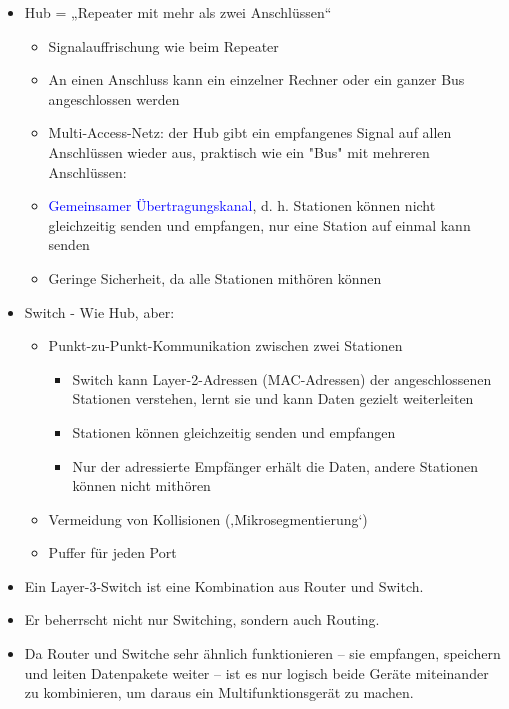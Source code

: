 \begin{itemize}
    \item Hub = „Repeater mit mehr als zwei Anschlüssen“
    \begin{itemize}
        \item Signalauffrischung wie beim Repeater
        \item An einen Anschluss kann ein einzelner Rechner oder ein ganzer Bus angeschlossen werden
        \item Multi-Access-Netz: der Hub gibt ein empfangenes Signal auf allen Anschlüssen wieder aus, praktisch wie ein "Bus" mit mehreren Anschlüssen:
        \item \textcolor{blue}{Gemeinsamer Übertragungskanal}, d. h. Stationen können nicht gleichzeitig senden und empfangen, nur eine Station auf einmal kann senden
        \item Geringe Sicherheit, da alle Stationen mithören können
    \end{itemize}
    \item Switch - Wie Hub, aber:
    \begin{itemize}
        \item Punkt-zu-Punkt-Kommunikation zwischen zwei Stationen
        \begin{itemize}
            \item Switch kann Layer-2-Adressen (MAC-Adressen) der angeschlossenen Stationen verstehen, lernt sie und kann Daten gezielt weiterleiten
            \item Stationen können gleichzeitig senden und empfangen
            \item Nur der adressierte Empfänger erhält die Daten, andere Stationen können nicht mithören
        \end{itemize}
        \item Vermeidung von Kollisionen (‚Mikrosegmentierung‘)
        \item Puffer für jeden Port
    \end{itemize}
\end{itemize}

\begin{itemize}
    \item Ein Layer-3-Switch ist eine Kombination aus Router und Switch.
    \item Er beherrscht nicht nur Switching, sondern auch Routing.
    \item Da Router und Switche sehr ähnlich funktionieren – sie empfangen, speichern und leiten Datenpakete weiter – ist es nur logisch beide Geräte miteinander zu kombinieren, um daraus ein Multifunktionsgerät zu machen.
\end{itemize}

